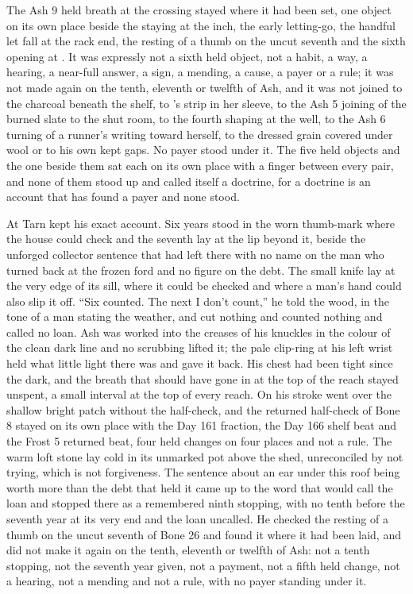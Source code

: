 The Ash 9 held breath at the crossing stayed where it had been set, one object on its own place beside the staying at the inch, the early letting-go, the handful let fall at the rack end, the resting of a thumb on the uncut seventh and the sixth opening at . It was expressly not a sixth held object, not a habit, a way, a hearing, a near-full answer, a sign, a mending, a cause, a payer or a rule; it was not made again on the tenth, eleventh or twelfth of Ash, and it was not joined to the charcoal beneath the shelf, to 's strip in her sleeve, to the Ash 5 joining of the burned slate to the shut room, to the fourth shaping at the well, to the Ash 6 turning of a runner's writing toward herself, to the dressed grain covered under wool or to his own kept gaps. No payer stood under it. The five held objects and the one beside them sat each on its own place with a finger between every pair, and none of them stood up and called itself a doctrine, for a doctrine is an account that has found a payer and none stood.

At  Tarn kept his exact account. Six years stood in the worn thumb-mark where the house could check and the seventh lay at the lip beyond it, beside the unforged collector sentence that  had left there with no name on the man who turned back at the frozen ford and no figure on the debt. The small knife lay at the very edge of its sill, where it could be checked and where a man's hand could also slip it off. “Six counted. The next I don't count,” he told the wood, in the tone of a man stating the weather, and cut nothing and counted nothing and called no loan. Ash was worked into the creases of his knuckles in the colour of the clean dark line and no scrubbing lifted it; the pale clip-ring at his left wrist held what little light there was and gave it back. His chest had been tight since the dark, and the breath that should have gone in at the top of the reach stayed unspent, a small interval at the top of every reach. On  his stroke went over the shallow bright patch without the half-check, and the returned half-check of Bone 8 stayed on its own place with the Day 161 fraction, the Day 166 shelf beat and the Frost 5 returned beat, four held changes on four places and not a rule. The warm loft stone lay cold in its unmarked pot above the shed, unreconciled by not trying, which is not forgiveness. The sentence about an ear under this roof being worth more than the debt that held it came up to the word that would call the loan and stopped there as a remembered ninth stopping, with no tenth before the seventh year at its very end and the loan uncalled. He checked the resting of a thumb on the uncut seventh of Bone 26 and found it where it had been laid, and did not make it again on the tenth, eleventh or twelfth of Ash: not a tenth stopping, not the seventh year given, not a payment, not a fifth held change, not a hearing, not a mending and not a rule, with no payer standing under it.

